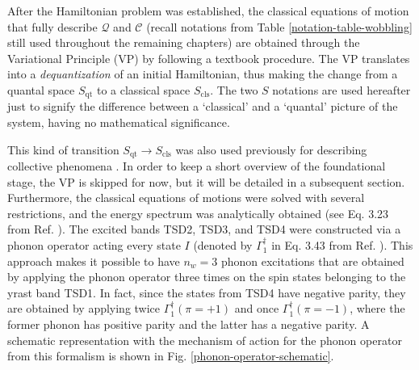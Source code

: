 After the Hamiltonian problem was established, the classical equations of motion that fully describe $\mathcal{Q}$ and $\mathscr{C}$ (recall notations from Table \ref{notation-table-wobbling} still used throughout the remaining chapters) are obtained through the Variational Principle (VP) by following a textbook procedure. The VP translates into a \emph{dequantization} of an initial Hamiltonian, thus making the change from a quantal space $S_\text{qt}$ to a classical space $S_\text{cls}$. The two $S$ notations are used hereafter just to signify the difference between a `classical' and a `quantal' picture of the system, having no mathematical significance. 

This kind of transition $S_\text{qt}\to S_\text{cls}$ was also used previously for describing collective phenomena \cite{raduta2007semiclassical,chen2016two,budaca2018tilted}. In order to keep a short overview of the foundational stage, the VP is skipped for now, but it will be detailed in a subsequent section. Furthermore, the classical equations of motions were solved with several restrictions, and the energy spectrum was analytically obtained (see Eq. 3.23 from Ref. \cite{raduta2017semiclassical}). The excited bands TSD2, TSD3, and TSD4 were constructed via a phonon operator acting every state $I$ (denoted by $\Gamma_1^\dagger$ in Eq. 3.43 from Ref. \cite{raduta2017semiclassical}). This approach makes it possible to have $n_w=3$ phonon excitations that are obtained by applying the phonon operator three times on the spin states belonging to the yrast band TSD1. In fact, since the states from TSD4 have negative parity, they are obtained by applying twice $\Gamma_1^\dagger(\pi=+1)$ and once $\Gamma_1^\dagger(\pi=-1)$, where the former phonon has positive parity and the latter has a negative parity. A schematic representation with the mechanism of action for the phonon operator from this formalism is shown in Fig. \ref{phonon-operator-schematic}.
